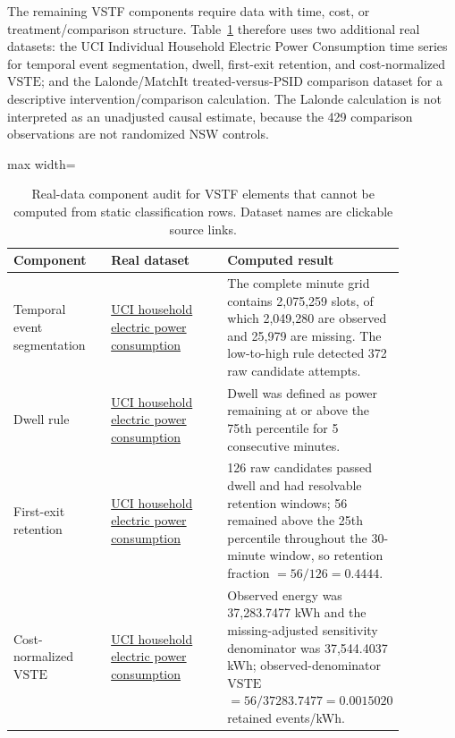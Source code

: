 \documentclass[11pt,a4paper]{article}
\newcommand{\VSTE}{\ensuremath{\mathrm{VSTE}}}
\newcommand{\1}{\mathbf{1}}
\begin{document}
The remaining VSTF components require data with time, cost, or treatment/comparison structure. Table~\ref{tab:real-component-datasets} therefore uses two additional real datasets: the UCI Individual Household Electric Power Consumption time series for temporal event segmentation, dwell, first-exit retention, and cost-normalized \VSTE{}; and the Lalonde/MatchIt treated-versus-PSID comparison dataset for a descriptive intervention/comparison calculation. The Lalonde calculation is not interpreted as an unadjusted causal estimate, because the 429 comparison observations are not randomized NSW controls.

\begin{table}[h]
\centering
\caption{Real-data component audit for VSTF elements that cannot be computed from static classification rows. Dataset names are clickable source links.}
\label{tab:real-component-datasets}
\scriptsize
\begin{adjustbox}{max width=\linewidth}
\begin{tabular}{p{0.25\linewidth}p{0.30\linewidth}p{0.32\linewidth}}
\toprule
Component & Real dataset & Computed result \\
\midrule
Temporal event segmentation & \href{https://archive.ics.uci.edu/ml/machine-learning-databases/00235/household_power_consumption.zip}{UCI household electric power consumption} & The complete minute grid contains 2,075,259 slots, of which 2,049,280 are observed and 25,979 are missing. The low-to-high rule detected 372 raw candidate attempts. \\
Dwell rule & \href{https://archive.ics.uci.edu/ml/machine-learning-databases/00235/household_power_consumption.zip}{UCI household electric power consumption} & Dwell was defined as power remaining at or above the 75th percentile for 5 consecutive minutes. \\
First-exit retention & \href{https://archive.ics.uci.edu/ml/machine-learning-databases/00235/household_power_consumption.zip}{UCI household electric power consumption} & 126 raw candidates passed dwell and had resolvable retention windows; 56 remained above the 25th percentile throughout the 30-minute window, so retention fraction $=56/126=0.4444$. \\
Cost-normalized \VSTE{} & \href{https://archive.ics.uci.edu/ml/machine-learning-databases/00235/household_power_consumption.zip}{UCI household electric power consumption} & Observed energy was 37,283.7477 kWh and the missing-adjusted sensitivity denominator was 37,544.4037 kWh; observed-denominator \VSTE{} $=56/37283.7477=0.0015020$ retained events/kWh. \\

\end{tabular}
\end{adjustbox}
\end{table}
\end{document}
